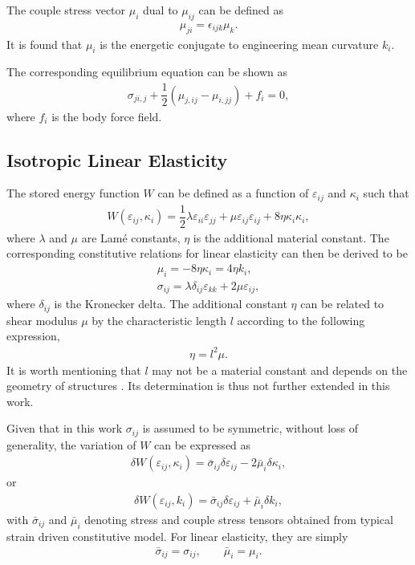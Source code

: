 \documentclass[3p,sort&compress,11pt,fleqn,review]{elsarticle}
\begin{document}
The couple stress vector $\mu_i$ dual to $\mu_{ij}$ can be defined as
\begin{gather}
\mu_{ji}=\epsilon_{ijk}\mu_k.
\end{gather}
It is found that $\mu_i$ is the energetic conjugate to engineering mean curvature $k_i$.

The corresponding equilibrium equation can be shown as
\begin{gather}\label{eq:equilibrium}
\sigma_{ji,j}+\dfrac{1}{2}\left(\mu_{j,ij}-\mu_{i,jj}\right)+f_i=0,
\end{gather}
where $f_i$ is the body force field.
\subsection{Isotropic Linear Elasticity}
The stored energy function $W$ can be defined as a function of $\varepsilon_{ij}$ and $\kappa_i$ such that
\begin{gather}\label{eq:stored_energy}
W\left(\varepsilon_{ij},\kappa_i\right)=\dfrac{1}{2}\lambda\varepsilon_{ii}\varepsilon_{jj}+\mu\varepsilon_{ij}\varepsilon_{ij}+8\eta\kappa_i\kappa_i,
\end{gather}
where $\lambda$ and $\mu$ are Lam\'{e} constants, $\eta$ is the additional material constant. The corresponding constitutive relations for linear elasticity can then be derived to be
\begin{gather}\label{eq:constitutive_couple}
\mu_i=-8\eta\kappa_i=4\eta{}k_i,\\
\sigma_{ij}=\lambda\delta_{ij}\varepsilon_{kk}+2\mu\varepsilon_{ij},
\end{gather}
where $\delta_{ij}$ is the Kronecker delta. The additional constant $\eta$ can be related to shear modulus $\mu$ by the characteristic length $l$ according to the following expression,
\begin{gather}
\eta=l^2\mu.
\end{gather}
It is worth mentioning that $l$ may not be a material constant and depends on the geometry of structures \citep{Khorshidi2018}. Its determination is thus not further extended in this work.

Given that in this work $\sigma_{ij}$ is assumed to be symmetric, without loss of generality, the variation of $W$ can be expressed as
\begin{gather}\label{eq:potential_energy}
\delta{}W\left(\varepsilon_{ij},\kappa_i\right)=\bar{\sigma}_{ij}\delta\varepsilon_{ij}-2\bar{\mu}_{i}\delta\kappa_i,
\end{gather}
or
\begin{gather}
\delta{}W\left(\varepsilon_{ij},k_i\right)=\bar{\sigma}_{ij}\delta\varepsilon_{ij}+\bar{\mu}_{i}\delta{}k_i,
\end{gather}
with $\bar{\sigma}_{ij}$ and $\bar{\mu}_{i}$ denoting stress and couple stress tensors obtained from typical strain driven constitutive model. For linear elasticity, they are simply
\begin{gather*}
\bar{\sigma}_{ij}=\sigma_{ij},\qquad\bar{\mu}_{i}=\mu_{i}.
\end{gather*}
\end{document}
